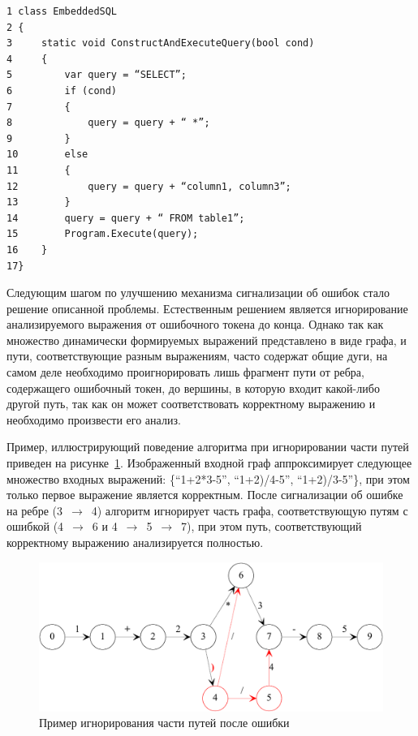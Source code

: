 \documentclass{matmex-diploma}
\begin{document}
\begin{verbatim}
1 class EmbeddedSQL 
2 {
3     static void ConstructAndExecuteQuery(bool cond)
4     {
5         var query = “SELECT”;
6         if (cond)
7         {
8             query = query + “ *”; 
9         }
10        else
11        {
12            query = query + “column1, column3”;
13        }
14        query = query + “ FROM table1”;
15        Program.Execute(query);
16    }
17}
\end{verbatim}

Следующим шагом по улучшению механизма сигнализации об ошибок стало решение 
описанной проблемы. Естественным решением является игнорирование анализируемого 
выражения от ошибочного токена до конца. Однако так как множество динамически 
формируемых выражений представлено в виде графа, и пути, соответствующие разным 
выражениям, часто содержат общие дуги, на самом деле необходимо проигнорировать 
лишь фрагмент пути от ребра, содержащего ошибочный токен, до вершины, в которую 
входит какой-либо другой путь, так как он может соответствовать корректному 
выражению и необходимо произвести его анализ.

Пример, иллюстрирующий поведение алгоритма при игнорировании части путей приведен 
на рисунке~\ref{ignor}. Изображенный входной граф аппроксимирует следующее множество входных 
выражений: \{“1+2*3-5”, “1+2)/4-5”, “1+2)/3-5”\}, при этом только первое выражение 
является корректным. После сигнализации об ошибке на ребре (3~$\to$~4) алгоритм 
игнорирует часть графа, соответствующую путям с ошибкой (4~$\to$~6 и 4~$\to$~5~$\to$~7), 
при этом путь, соответствующий корректному выражению анализируется полностью.

\begin{figure}[h]
 \label{ignor}
 \centering
 \includegraphics[width=15cm]{IgnoringPaths.pdf}
 \caption{Пример игнорирования части путей после ошибки}
 \label{ignor}
\end{figure}
\end{document}
